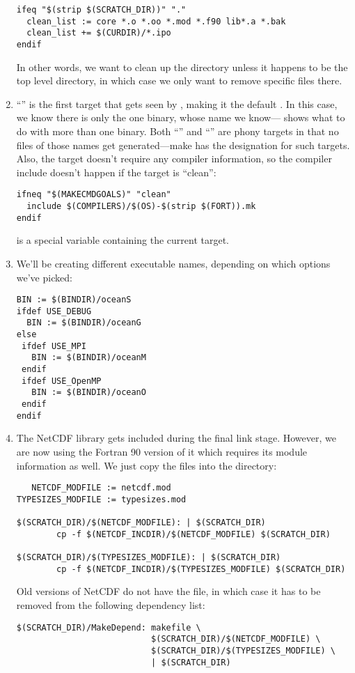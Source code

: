 \begin{enumerate}
\begin{verbatim}
ifeq "$(strip $(SCRATCH_DIR))" "."
  clean_list := core *.o *.oo *.mod *.f90 lib*.a *.bak
  clean_list += $(CURDIR)/*.ipo
endif
\end{verbatim}
In other words, we want to clean up the  directory unless
it happens to be the top level directory, in which case we only want
to remove specific files there.

\item ``'' is the first target that gets seen by ,
making it the default . In this case, we know there is only
the one binary, whose name we know---\cite{GMAKE} shows what to
do with more than one binary. Both ``'' and ``''
are phony targets in that no files of those names get generated---make
has the  designation for such targets. Also, the 
target doesn't require any compiler information, so the compiler include
doesn't happen if the target is ``clean'':

\begin{verbatim}
ifneq "$(MAKECMDGOALS)" "clean"
  include $(COMPILERS)/$(OS)-$(strip $(FORT)).mk
endif
\end{verbatim}
 is a special variable containing the current
 target.

\item We'll be creating different executable names, depending on
which options we've picked:
\begin{verbatim}
BIN := $(BINDIR)/oceanS
ifdef USE_DEBUG
  BIN := $(BINDIR)/oceanG
else
 ifdef USE_MPI
   BIN := $(BINDIR)/oceanM
 endif
 ifdef USE_OpenMP
   BIN := $(BINDIR)/oceanO
 endif
endif
\end{verbatim}

\item The NetCDF library gets included during the final link stage.
However, we are now using the Fortran 90 version of it which
requires its module information as well. We just copy the 
files into the  directory:
\begin{verbatim}
   NETCDF_MODFILE := netcdf.mod
TYPESIZES_MODFILE := typesizes.mod

$(SCRATCH_DIR)/$(NETCDF_MODFILE): | $(SCRATCH_DIR)
        cp -f $(NETCDF_INCDIR)/$(NETCDF_MODFILE) $(SCRATCH_DIR)

$(SCRATCH_DIR)/$(TYPESIZES_MODFILE): | $(SCRATCH_DIR)
        cp -f $(NETCDF_INCDIR)/$(TYPESIZES_MODFILE) $(SCRATCH_DIR)
\end{verbatim}
Old versions of NetCDF do not have the  file, in which
case it has to be removed from the following dependency list:
\begin{verbatim}
$(SCRATCH_DIR)/MakeDepend: makefile \
                           $(SCRATCH_DIR)/$(NETCDF_MODFILE) \
                           $(SCRATCH_DIR)/$(TYPESIZES_MODFILE) \
                           | $(SCRATCH_DIR)
\end{verbatim}


\end{enumerate}
